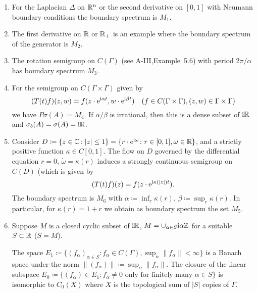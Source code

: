 \begin{examples}\label{ex:b3-2.6}%

\begin{enumerate}[\upshape (i), wide, labelindent=.5em]
\item
For the Laplacian $\Delta$ on $\mathbb{R}^{n}$ or the second derivative on $[0,1]$ with Neumann boundary conditions the boundary spectrum is $M_{1}$.
	
\item
The first derivative on $\mathbb{R}$ or $\mathbb{R}_{+}$ is an example where the boundary spectrum of the generator is $M_{2}$.
	
\item
The rotation semigroup on $C(\Gamma)$ (see A-III,Example~5.6) with period $2\pi/\alpha$ has boundary spectrum $M_{3}$.

\item
For the semigroup on $C(\Gamma \times \Gamma)$ given by
	\[
	(T(t)f)(z,w) = f(z\cdot \mathrm{e}^{\mathrm{i}\alpha t},w\cdot \mathrm{e}^{\mathrm{i}\beta  t}) \quad (f \in C(\Gamma \times \Gamma), (z,w) \in \Gamma \times \Gamma)
	\]
	we have $P\sigma(A) = M_{4}$.
	If $\alpha/\beta$ is irrational, then this is a dense subset of $\mathrm{i} \mathbb{R}$ and $\sigma_{b}(A) = \sigma(A) = \mathrm{i}\mathbb{R}$.
	
\item
Consider $D \coloneqq \{z \in \mathbb{C} \colon |z| \leq 1\} = \{r\cdot \mathrm{e}^{\mathrm{i}\omega} \colon r \in [0,1], \omega \in \mathbb{R}\}$, and a strictly positive function $\kappa \in C[0,1]$.
	The flow on $D$ governed by the differential equation $\dot{r} = 0$, $\dot{\omega} = \kappa(r)$ induces a strongly continuous semigroup on $C(D)$ (which is given by
	\[
	(T(t)f)(z) = f(z\cdot \mathrm{e}^{\mathrm{i}\kappa(|z|)t}).
	\]
	The boundary spectrum is $M_{6}$ with $\alpha \coloneqq \inf_r \kappa(r)$, $\beta \coloneqq \sup_r \kappa(r)$.
	In particular, for $\kappa(r) = 1 + r$ we obtain as boundary spectrum the set $M_{5}$.
	
\item
Suppose $M$ is a closed cyclic subset of $\mathrm{i} \mathbb{R}$, $M = \cup_{\alpha \in S} \mathrm{i}\alpha\mathbb{Z}$ for a suitable $S \subset \mathbb{R}$ (\eg $S = M$).
	
	The space $E_{1} \coloneqq \{(f_{\alpha})_{\alpha \in S} \colon f_{\alpha} \in C(\Gamma), \sup_\alpha \|f_{\alpha}\| < \infty\}$ is a Banach space under the norm $\|(f_{\alpha})\| \coloneqq \sup_\alpha \|f_{\alpha}\|$.
	The closure of the linear subspace $E_{0} \coloneqq \{(f_{\alpha}) \in E_{1} \colon f_{\alpha} \neq 0 \text{ only for finitely many } \alpha \in S\}$ is isomorphic to $C_{0}(X)$ where $X$ is the topological sum of $|S|$ copies of $\Gamma$.
	

\end{enumerate}
\end{examples}

